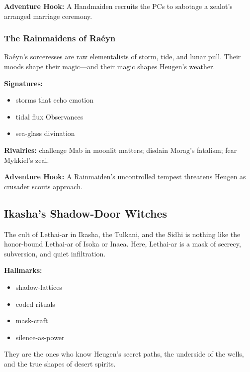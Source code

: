 \documentclass[11pt]{book}
\begin{document}
\textbf{Adventure Hook:} A Handmaiden recruits the PCs to sabotage a zealot's arranged marriage ceremony.

\subsubsection{The Rainmaidens of Raéyn}

Raéyn's sorceresses are raw elementalists of storm, tide, and lunar pull.  
Their moods shape their magic---and their magic shapes Heugen's weather.

\textbf{Signatures:}
\begin{itemize}[leftmargin=*]
    \item storms that echo emotion  
    \item tidal flux Observances  
    \item sea-glass divination  
\end{itemize}

\textbf{Rivalries:} challenge Mab in moonlit matters; disdain Morag's fatalism; fear Mykkiel's zeal.

\textbf{Adventure Hook:} A Rainmaiden's uncontrolled tempest threatens Heugen as crusader scouts approach.

\subsection{Ikasha's Shadow-Door Witches}

The cult of Lethai-ar in Ikasha, the Tulkani, and the Sidhi is nothing like the honor-bound  
Lethai-ar of Isoka or Inaea. Here, Lethai-ar is a mask of secrecy, subversion,  
and quiet infiltration.

\textbf{Hallmarks:}
\begin{itemize}
    \item shadow-lattices  
    \item coded rituals  
    \item mask-craft  
    \item silence-as-power  
\end{itemize}

They are the ones who know Heugen's secret paths, the underside of the wells,  
and the true shapes of desert spirits.
\end{document}
